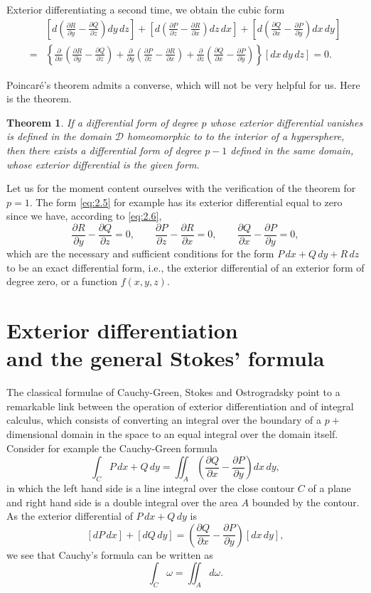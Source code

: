 \documentclass[leqno,11pt]{book}
\numberwithin{equation}{chapter}
\newcommand{\pd}{\partial}
\theoremstyle{shape1}
\newtheorem*{thm*}{\hspace{15pt}Theorem}
\theoremstyle{shape0}
\theoremstyle{shape2}
\theoremstyle{definition}
\begin{document}
Exterior differentiating a second time, we obtain the cubic form
\begin{align*}
  &\left[d\left(\frac{\pd R}{\pd y}-\frac{\pd Q}{\pd z}\right)dy\,dz\right]+
  \left[d\left(\frac{\pd P}{\pd z}-\frac{\pd R}{\pd x}\right)dz\,dx\right]+
  \left[d\left(\frac{\pd Q}{\pd x}-\frac{\pd P}{\pd y}\right)dx\,dy\right]\\
=&\left\{
\frac{\pd}{\pd x}\left(\frac{\pd R}{\pd y}-\frac{\pd Q}{\pd z}\right)+
\frac{\pd}{\pd y}\left(\frac{\pd P}{\pd z}-\frac{\pd R}{\pd x}\right)+
\frac{\pd}{\pd z}\left(\frac{\pd Q}{\pd x}-\frac{\pd P}{\pd y}\right)\right\}[dx\,dy\,dz]=0.
\end{align*}

Poincar\'e's theorem admits a converse, which will not be very helpful for us. Here is the theorem.
\begin{thm*}
  If a differential form of degree $p$ whose exterior differential vanishes is defined in the domain $\mathcal{D}$ homeomorphic to to the interior of a hypersphere, then there exists a differential form of degree $p-1$ defined in the same domain, whose exterior differential is the given form.
\end{thm*}

Let us for the moment content ourselves with the verification of the theorem for $p=1$. The form \eqref{eq:2.5} for example has its exterior differential equal to zero since we have, according to \eqref{eq:2.6},
\[
\frac{\pd R}{\pd y}-\frac{\pd Q}{\pd z}=0,\qquad
\frac{\pd P}{\pd z}-\frac{\pd R}{\pd x}=0,\qquad
\frac{\pd Q}{\pd x}-\frac{\pd P}{\pd y}=0,
\]
which are the necessary and sufficient conditions for the form $P\,dx+Q\,dy+R\,dz$ to be an exact differential form, {i.e.}, the exterior differential of an exterior form of degree zero, or a function $f(x,y,z)$.

\section[{Exterior differentiation and the general Stokes' formula}]{Exterior differentiation\\and the general Stokes' formula}
\label{sec:exter-diff-gener}

\fsec The classical formulae of Cauchy-Green,  Stokes and  Ostrogradsky point to a remarkable link between the operation of exterior differentiation and  of integral calculus, which consists of converting an integral over the boundary of a $p+$ dimensional domain in the space to an equal integral over the domain itself. Consider for example the Cauchy-Green formula
\[
\int_{C}P\,dx+Q\,dy=\iint_{A}\left(\frac{\pd Q}{\pd x}-\frac{\pd P}{\pd y}\right)dx\,dy,
\]
in which the left hand side is a line integral over the close contour $C$ of a plane and  right hand side is a double integral over the area $A$ bounded by the contour. As the exterior differential of $P\,dx+Q\,dy$ is
\[
[dP\,dx]+[dQ\,dy]=\left(\frac{\pd Q}{\pd x}-\frac{\pd P}{\pd y}\right)[dx\,dy],
\]
we see that Cauchy's formula can be written as
\begin{equation}
  \label{eq:2.7}
  \int_{C}\omega=\iint_{A}d\omega.
\end{equation}
\end{document}
